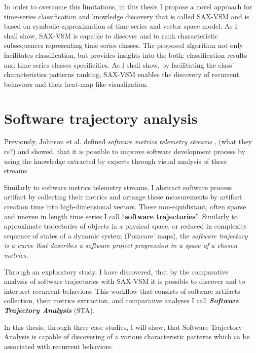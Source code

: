 In order to overcome this limitations, in this thesis I propose a novel approach for time-series classification and 
knowledge discovery that is called SAX-VSM and is based on symbolic approximation of time series and vector space model. 
As I shall show, SAX-VSM is capable to discover and to rank characteristic subsequences representing time series classes. 
The proposed algorithm not only facilitates classification, but provides insights into the both: classification results 
and time series classes specificities. As I shall show, by facilitating the class' characteristics patterns ranking,
SAX-VSM enables the discovery of recurrent behaviors and their heat-map like visualization. 

\section{Software trajectory analysis}\label{section_trajectory_definition}
Previously, Johnson et al. defined \textit{software metrics telemetry streams} \cite{citeulike:12550871}, 
(what they re?) and showed, that it is possible to improve software development process by using the 
knowledge extracted by experts through visual analysis of these streams.
 
Similarly to software metrics telemetry streams, I abstract software process artifact by collecting their 
metrics and arrange these measurements by artifact creation time into high-dimensional vectors. 
These non-equidistant, often sparse and uneven in length time series 
I call ``\textbf{software trajectories}''. Similarly to approximate trajectories of objects in 
a physical space, or reduced in complexity sequence of states of a dynamic system (Poincare' maps), 
the \textit{software trajectory is a curve that describes a software project progression in a space 
of a chosen metrics}.

Through an exploratory study, I have discovered, that by the comparative analysis of software trajectories 
with SAX-VSM it is possible to discover and to interpret recurrent behaviors. This workflow that 
consists of software artifacts collection, their metrics extraction, and comparative analyses I call 
\textit{\textbf{Software Trajectory Analysis}} (STA). 

In this thesis, through three case studies, I will show, that Software Trajectory Analysis is capable 
of discovering of a various characteristic patterns which ca be associated with recurrent behaviors.

